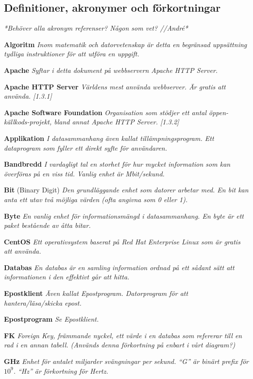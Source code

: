 \documentclass[a4paper, twoside, 11pt, titlepage]{article}
\begin{document}
	\subsection{Definitioner, akronymer och förkortningar}


	\emph{*Behöver alla akronym referenser? Någon som vet? //André*} 

	\textbf{Algoritm} \emph{Inom matematik och datorvetenskap är detta en begränsad uppsättning tydliga instruktioner för att utföra en uppgift.}

	\textbf{Apache} \emph{Syftar i detta dokument på webbservern  Apache HTTP Server.}

	\textbf{Apache HTTP Server} \emph{Världens mest använda webbserver. Är gratis att använda. [1.3.1]}

	\textbf{Apache Software Foundation} \emph{Organisation som stödjer ett antal öppen-källkods-projekt, bland annat Apache HTTP Server. [1.3.2]}

	\textbf{Applikation} \emph{I datasammanhang även kallat tillämpningsprogram. Ett dataprogram som fyller ett direkt syfte för användaren.}

	\textbf{Bandbredd} \emph{I vardagligt tal en storhet för hur mycket information som kan överföras på en viss tid. Vanlig enhet är Mbit/sekund.}

	\textbf{Bit} (Binary Digit) \emph{Den grundläggande enhet som datorer arbetar med. En bit kan anta ett utav två möjliga värden (ofta angivna som 0 eller 1).}

	\textbf{Byte} \emph{En vanlig enhet för informationsmängd i datasammanhang. En byte är ett paket bestående av åtta bitar.}

	\textbf{CentOS} \emph{Ett operativsystem baserat på Red Hat Enterprise Linux som är gratis att använda.}

	\textbf{Databas} \emph{En databas är en samling information ordnad på ett sådant sätt att informationen i den effektivt går att hitta.}

	\textbf{Epostklient} \emph{Även kallat Epostprogram. Datorprogram för att hantera/läsa/skicka epost.}

	\textbf{Epostprogram} \emph{Se Epostklient.}

	\textbf{FK} \emph{Foreign Key, främmande nyckel, ett värde i en databas som refererar till en rad i en annan tabell. (Används denna förkortning på enbart i vårt diagram?)}

	\textbf{GHz} \emph{Enhet för antalet miljarder svängningar per sekund. ``G'' är binärt prefix för $10^9$. ``Hz'' är förkortning för Hertz.}
\end{document}
